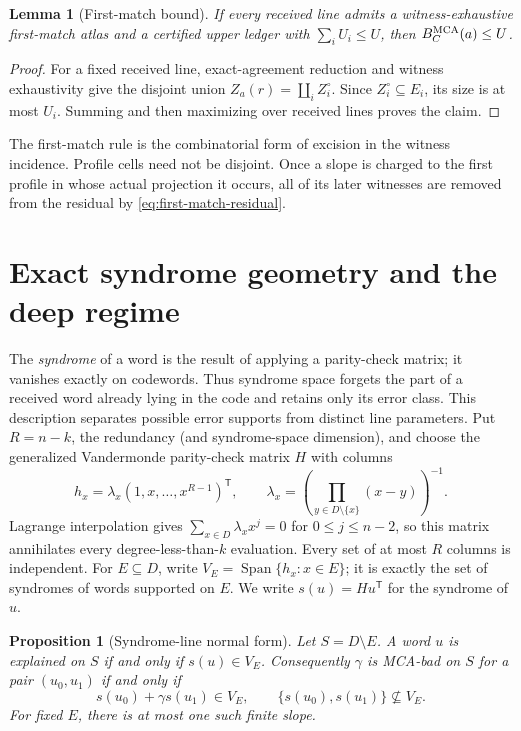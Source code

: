 \documentclass[12pt,a4paper]{amsart}
\numberwithin{equation}{section}
\newtheorem{proposition}[proposition]{Proposition}
\newtheorem{lemma}[lemma]{Lemma}
\theoremstyle{remark}
\DeclareMathOperator{\Span}{Span}
\begin{document}
\begin{lemma}[First-match bound]\label{lem:first-match-bound}
If every received line admits a witness-exhaustive first-match atlas and a
certified upper ledger with \(\sum_iU_i\le U\), then
\(B_C^{\rm MCA}(a)\le U\).
\end{lemma}

\begin{proof}
For a fixed received line, exact-agreement reduction and witness
exhaustivity give the disjoint union
\(Z_a(r)=\coprod_iZ_i^\circ\).  Since
\(Z_i^\circ\subseteq E_i\), its size is at most \(U_i\).  Summing and then
maximizing over received lines proves the claim.
\end{proof}

The first-match rule is the combinatorial form of excision in the witness
incidence.  Profile cells need not be disjoint.  Once a slope is charged to
the first profile in whose actual projection it occurs, all of its later
witnesses are removed from the residual by
\eqref{eq:first-match-residual}.

\section{Exact syndrome geometry and the deep regime}
\label{sec:syndrome-exact}

The \emph{syndrome} of a word is the result of applying a parity-check
matrix; it vanishes exactly on codewords.  Thus syndrome space forgets the
part of a received word already lying in the code and retains only its error
class.  This description separates possible error supports from distinct
line parameters.  Put \(R=n-k\), the redundancy (and syndrome-space
dimension), and choose the generalized Vandermonde parity-check matrix
\(H\) with columns
\[
 h_x=\lambda_x(1,x,\ldots,x^{R-1})^{\mathsf T},\qquad
 \lambda_x=\left(\prod_{y\in D\setminus\{x\}}(x-y)\right)^{-1}.
 \tag{3.1}\label{eq:parity-columns}
\]
Lagrange interpolation gives
\(\sum_{x\in D}\lambda_xx^j=0\) for \(0\le j\le n-2\), so this matrix
annihilates every degree-less-than-\(k\) evaluation.  Every set of at most
\(R\) columns is independent.  For \(E\subseteq D\), write
\(V_E=\Span\{h_x:x\in E\}\); it is exactly the set of syndromes of words
supported on \(E\).  We write \(s(u)=Hu^{\mathsf T}\) for the syndrome of
\(u\).

\begin{proposition}[Syndrome-line normal form]
\label{prop:syndrome-line-normal-form}
Let \(S=D\setminus E\).  A word \(u\) is explained on \(S\) if and only if
\(s(u)\in V_E\).  Consequently \(\gamma\) is MCA-bad on \(S\) for a pair
\((u_0,u_1)\) if and only if
\[
 s(u_0)+\gamma s(u_1)\in V_E,
 \qquad
 \{s(u_0),s(u_1)\}\not\subseteq V_E.
 \tag{3.2}\label{eq:syndrome-line}
\]
For fixed \(E\), there is at most one such finite slope.
\end{proposition}
\end{document}
